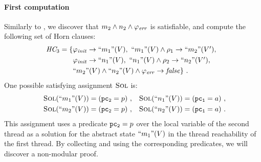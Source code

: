\paragraph{First \aret computation} 

Similarly to \TakeLockBit, we discover that $m_2 \land n_2 \land
\varphi_{\mathit{err}}$ is satisfiable, and compute the following set of Horn
clauses:
%
\begin{equation*}
  \HornClauses_3 = \set{
  \begin{array}[t]{@{}l}
     \SymbInit \limplies \unkOf{m_1}(\Vars),\
     \unkOf{m_1}(\Vars) \land \rel_1 \limplies \unkOf{m_2}(\Vars'),\\[\jot]
     \SymbInit \limplies \unkOf{n_1}(\Vars),\ 
     \unkOf{n_1}(\Vars) \land \rel_2 \limplies \unkOf{n_2}(\Vars'),\\[\jot]
     \unkOf{m_2}(\Vars) \land \unkOf{n_2}(\Vars) \land \SymbError \limplies 
     \lfalse }\ .
  \end{array}
\end{equation*}
%
One possible satisfying assignment $\textsc{Sol}$ is:
\begin{equation*}
  \begin{array}[t]{l@{\;=\;}ll@{\;=\;}l@{}}
    \SolutionOf{\unkOf{m_1}(\Vars)} & (\pctwo=p)\ , & 
    \SolutionOf{\unkOf{n_1}(\Vars)} & (\pcone=a)\ , \\[\jot]
    \SolutionOf{\unkOf{m_2}(\Vars)} & (\pctwo=p)\ , & 
    \SolutionOf{\unkOf{n_2}(\Vars)} & (\pcone=a)\ .
  \end{array}
\end{equation*} 
%
This assignment uses a predicate $\mathtt{pc_2}=p$ over the local variable of
the second thread as a solution for the abstract state
$\text{``}m_1\text{''}(V)$ in the thread reachability of the first thread.
By collecting and using the corresponding predicates, we will discover
a non-modular proof.

